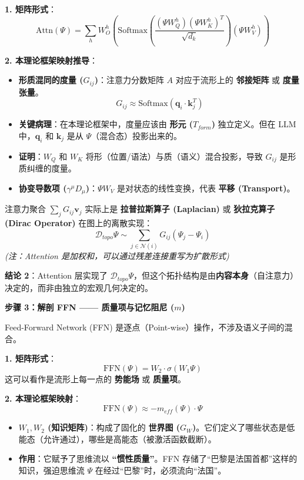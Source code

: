 \textbf{1. 矩阵形式}：
$$ \text{Attn}(\Psi) = \sum_{h} W_O^h \left( \text{Softmax}\left( \frac{(\Psi W_Q^h)(\Psi W_K^h)^T}{\sqrt{d_k}} \right) (\Psi W_V^h) \right) $$

\textbf{2. 本理论框架映射推导}：
\begin{itemize}
    \item   \textbf{形质混同的度量 ($G_{ij}$)}：注意力分数矩阵 $A$ 对应于流形上的 \textbf{邻接矩阵} 或 \textbf{度量张量}。
        $$ G_{ij} \approx \text{Softmax}( \mathbf{q}_i \cdot \mathbf{k}_j^T ) $$
    \item   \textbf{关键病理}：在本理论框架中，度量应该由 \textbf{形元 ($T_{form}$)} 独立定义。但在 LLM 中，$\mathbf{q}_i$ 和 $\mathbf{k}_j$ 是从 $\Psi$（混合态）投影出来的。
    \item   \textbf{证明}：$W_Q$ 和 $W_K$ 将形（位置/语法）与质（语义）混合投影，导致 $G_{ij}$ 是形质纠缠的度量。
    \item   \textbf{协变导数项 ($\gamma^\mu D_\mu$)}：$\Psi W_V$ 是对状态的线性变换，代表 \textbf{平移 (Transport)}。
\end{itemize}
注意力聚合 $\sum_j G_{ij} \mathbf{v}_j$ 实际上是 \textbf{拉普拉斯算子 (Laplacian)} 或 \textbf{狄拉克算子 (Dirac Operator)} 在图上的离散实现：
$$ \mathcal{D}_{topo} \Psi \sim \sum_{j \in \mathcal{N}(i)} G_{ij} (\Psi_j - \Psi_i) $$
\textit{(注：Attention 是加权和，可以通过残差连接重写为扩散形式)}

\textbf{结论 2}：Attention 层实现了 \textbf{$\mathcal{D}_{topo} \Psi$}，但这个拓扑结构是由\textbf{内容本身}（自注意力）决定的，而非由独立的宏观几何决定的。



\vspace{0.5em}\noindent\textbf{\textcolor{structurecolor}{步骤 3：解剖 FFN —— 质量项与记忆阻尼 ($m$)}}


Feed-Forward Network (FFN) 是逐点（Point-wise）操作，不涉及语义子间的混合。

\textbf{1. 矩阵形式}：
$$ \text{FFN}(\Psi) = W_2 \cdot \sigma(W_1 \Psi) $$
这可以看作是流形上每一点的 \textbf{势能场} 或 \textbf{质量项}。

\textbf{2. 本理论框架映射}：
$$ \text{FFN}(\Psi) \approx -m_{eff}(\Psi) \cdot \Psi $$
\begin{itemize}
    \item   \textbf{$W_1, W_2$ (知识矩阵)}：构成了固化的 \textbf{世界图 ($G_W$)}。它们定义了哪些状态是低能态（允许通过），哪些是高能态（被激活函数截断）。
    \item   \textbf{作用}：它赋予了思维流以 \textbf{“惯性质量”}。FFN 存储了“巴黎是法国首都”这样的知识，强迫思维流 $\Psi$ 在经过“巴黎”时，必须流向“法国”。
\end{itemize}



